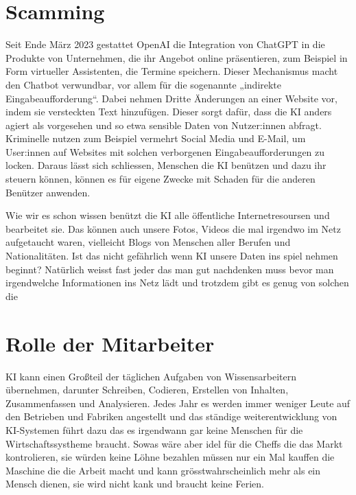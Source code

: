 \documentclass{report}
\begin{document}
 \section{Scamming}
 Seit Ende März 2023 gestattet OpenAI die Integration von ChatGPT in die Produkte von Unternehmen, 
 die ihr Angebot online präsentieren, zum Beispiel in Form virtueller Assistenten, die Termine speichern. 
 Dieser Mechanismus macht den Chatbot verwundbar, vor allem für die sogenannte „indirekte Eingabeaufforderung“.
 Dabei nehmen Dritte Änderungen an einer Website vor, indem sie versteckten Text hinzufügen. Dieser sorgt dafür,
dass die KI anders agiert als vorgesehen und so etwa sensible Daten von Nutzer:innen abfragt. Kriminelle nutzen 
zum Beispiel vermehrt Social Media und E-Mail, um User:innen auf Websites mit solchen verborgenen Eingabeaufforderungen zu locken.
Daraus lässt sich schliessen, Menschen die KI benützen und dazu ihr steuern können, können es für eigene Zwecke mit Schaden 
für die anderen Benützer anwenden. 

 Wie wir es schon wissen benützt die KI alle öffentliche Internetresoursen und bearbeitet sie. Das können auch unsere Fotos, Videos 
 die mal irgendwo im Netz aufgetaucht waren, vielleicht  Blogs von Menschen aller Berufen und Nationalitäten. 
Ist das nicht gefährlich wenn KI unsere Daten ins spiel nehmen beginnt? Natürlich weisst fast jeder das man gut nachdenken 
muss bevor man irgendwelche Informationen ins Netz lädt und trotzdem gibt es genug von solchen die 


\section{Rolle der Mitarbeiter}
  KI kann einen Großteil der täglichen Aufgaben von Wissensarbeitern übernehmen, darunter Schreiben,
   Codieren, Erstellen von Inhalten, Zusammenfassen und Analysieren.  Jedes Jahr es werden immer weniger Leute auf den
   Betrieben und Fabriken angestellt und das ständige weiterentwicklung von KI-Systemen führt dazu das es irgendwann gar keine Menschen
 für die Wirtschaftssystheme braucht. Sowas wäre aber idel für die Cheffs die das Markt kontrolieren, sie würden keine Löhne bezahlen müssen 
 nur ein Mal kauffen die Maschine die die Arbeit macht und kann grösstwahrscheinlich mehr als ein Mensch dienen, sie wird nicht kank und braucht keine 
 Ferien. 

\textbf{}
\textit{}





\end{document}
